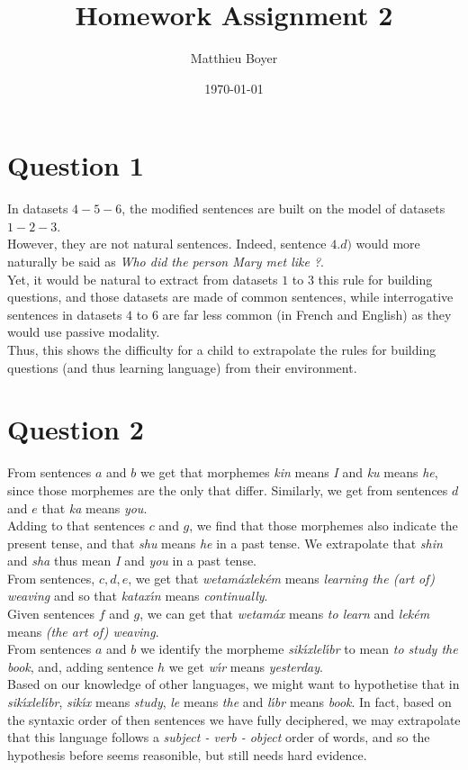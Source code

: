 \documentclass{cours}
\title{Homework Assignment 2}
\date{\today}
\author{Matthieu Boyer}
\begin{document}
    \section{Question 1}
        In datasets $4 - 5 - 6$, the modified sentences are built on the model of datasets $1 - 2 - 3$.\\
        However, they are not natural sentences. Indeed, sentence $4.d)$ would more naturally be said as \textsl{Who did the person Mary met like ?}.\\
        Yet, it would be natural to extract from datasets $1$ to $3$ this rule for building questions, and those datasets are made of common sentences, while interrogative sentences in datasets $4$ to $6$ are far less common (in French and English) as they would use passive modality.\\
        Thus, this shows the difficulty for a child to extrapolate the rules for building questions (and thus learning language) from their environment.

    \section{Question 2}
        From sentences $a$ and $b$ we get that morphemes \textsl{kin} means \textsl{I} and \textsl{ku} means \textsl{he}, since those morphemes are the only that differ. Similarly, we get from sentences $d$ and $e$ that \textsl{ka} means \textsl{you}.\\
        Adding to that sentences $c$ and $g$, we find that those morphemes also indicate the present tense, and that \textsl{shu} means \textsl{he} in a past tense. We extrapolate that \textsl{shin} and \textsl{sha} thus mean \textsl{I} and \textsl{you} in a past tense. \\
        From sentences, $c, d, e$, we get that \textsl{wetam\'{a}xlek\'{e}m} means \textsl{learning the (art of) weaving} and so that \textsl{katax\'{ı}n} means \textsl{continually}.\\
        Given sentences $f$ and $g$, we can get that \textsl{wetam\'{a}x} means \textsl{to learn} and \textsl{lek\'{e}m} means \textsl{(the art of) weaving}.\\
        From sentences $a$ and $b$ we identify the morpheme \textsl{sik\'{ı}xlel\'{ı}br} to mean \textsl{to study the book}, and, adding sentence $h$ we get \textsl{w\'{ı}r} means \textsl{yesterday}.\\
        Based on our knowledge of other languages, we might want to hypothetise that in \textsl{sik\'{ı}xlel\'{ı}br}, \textsl{sik\'{ı}x} means \textsl{study}, \textsl{le} means \textsl{the} and \textsl{l\'{ı}br} means \textsl{book}. 
        In fact, based on the syntaxic order of then sentences we have fully deciphered, we may extrapolate that this language follows a \textsl{subject - verb - object} order of words, and so the hypothesis before seems reasonible, but still needs hard evidence. 
\end{document}
